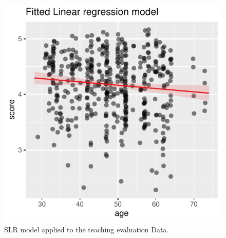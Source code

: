 \documentclass[
  letterpaper,
  DIV=11,
  numbers=noendperiod]{scrartcl}
\begin{document}
\begin{figure}[H]

{\centering \includegraphics{notes_files/figure-pdf/unnamed-chunk-21-1.pdf}

}

\caption{SLR model applied to the teaching evaluation Data.}

\end{figure}%
\end{document}
